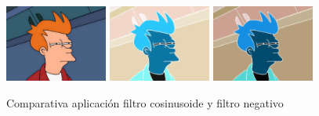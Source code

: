 \begin{figure}[H]
 \centering
  \includegraphics[width=0.3\textwidth]{imagenes/fry.jpg}
  \includegraphics[width=0.3\textwidth]{imagenes/fryCos.jpg}
  \includegraphics[width=0.3\textwidth]{imagenes/fryNegativo.jpg}
 \caption{Comparativa aplicación filtro cosinusoide y filtro negativo}
 \label{diseño}
 \end{figure}
